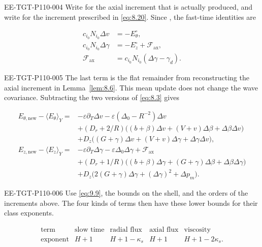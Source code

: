 \begin{EESegment}{EE-TGT-P110-004}
Write  for the axial increment that is actually produced, and
write  for the increment prescribed in \eqref{eq:8.20}. Since
, the fast-time
identities are
\end{EESegment}
\[
\begin{aligned}
c_{i_0}N_{i_0}\Delta v&=-E_\theta^\circ,\\
c_{i_0}N_{i_0}\Delta\gamma&=-E_z^\circ+\mathcal F_{\mathrm{ax}},\\
\mathcal F_{\mathrm{ax}}&=c_{i_0}N_{i_0}(\Delta\gamma-\gamma_d).
\end{aligned}
\]
\begin{EESegment}{EE-TGT-P110-005}
The last term is the flat remainder from reconstructing the axial increment in
Lemma~\ref{lem:8.6}. This mean update does not change the wave covariance. Subtracting the two
versions of \eqref{eq:8.3} gives
\end{EESegment}
\[
\begin{aligned}
E_{\theta,\mathrm{new}}-\langle E_\theta\rangle_Y
  ={}&-\varepsilon\partial_T\Delta v-\varepsilon(\Delta_0-R^{-2})\Delta v\\
     &+(D_r+2/R)\bigl((b+\beta)\Delta v+(V+v)\Delta\beta+\Delta\beta\Delta v\bigr)\\
     &+D_z\bigl((G+\gamma)\Delta v+(V+v)\Delta\gamma+\Delta\gamma\Delta v\bigr),\\
E_{z,\mathrm{new}}-\langle E_z\rangle_Y
  ={}&-\varepsilon\partial_T\Delta\gamma-\varepsilon\Delta_0\Delta\gamma+\mathcal F_{\mathrm{ax}}\\
     &+(D_r+1/R)\bigl((b+\beta)\Delta\gamma+(G+\gamma)\Delta\beta+\Delta\beta\Delta\gamma\bigr)\\
     &+D_z\bigl(2(G+\gamma)\Delta\gamma+(\Delta\gamma)^2+\Delta p_m\bigr).
\end{aligned}
\]
\begin{EESegment}{EE-TGT-P110-006}
Use \eqref{eq:9.9}, the bounds
 on the shell, and the orders of the
increments above. The four kinds of terms then have these lower bounds for their class exponents.
\end{EESegment}
\[
\begin{array}{c|cccc}
\text{term} & \text{slow time} & \text{radial flux} & \text{axial flux} & \text{viscosity}\\ \hline
\text{exponent} & H+1 & H+1-\kappa_s & H+1 & H+1-2\kappa_s.
\end{array}
\]
